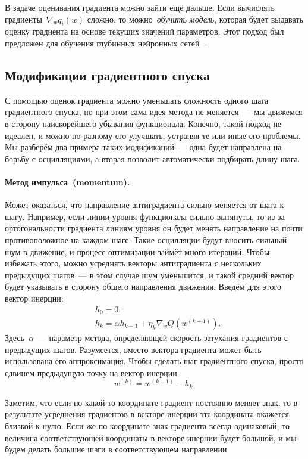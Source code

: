 \documentclass[12pt,fleqn]{article}
\begin{document}
В задаче оценивания градиента можно зайти ещё дальше.
Если вычислять градиенты~$\nabla_w q_i(w)$ сложно,
то можно~\emph{обучить модель}, которая будет выдавать оценку градиента на основе текущих значений параметров.
Этот подход был предложен для обучения глубинных нейронных сетей~\cite{jaderberg16synthetic}.

\subsection{Модификации градиентного спуска}

С помощью оценок градиента можно уменьшать сложность одного шага градиентного спуска,
но при этом сама идея метода не меняется~--- мы движемся в сторону наискорейшего убывания функционала.
Конечно, такой подход не идеален, и можно по-разному его улучшать, устраняя те или иные его проблемы.
Мы разберём два примера таких модификаций~--- одна будет направлена на борьбу с осцилляциями, а вторая
позволит автоматически подбирать длину шага.

\paragraph{Метод импульса~(momentum).}
Может оказаться, что направление антиградиента сильно меняется от шага к шагу.
Например, если линии уровня функционала сильно вытянуты, то из-за ортогональности градиента линиям уровня
он будет менять направление на почти противоположное на каждом шаге.
Такие осцилляции будут вносить сильный шум в движение, и процесс оптимизации займёт много итераций.
Чтобы избежать этого, можно усреднять векторы антиградиента с нескольких предыдущих шагов~--- в этом
случае шум уменьшится, и такой средний вектор будет указывать в сторону общего направления движения.
Введём для этого вектор инерции:
\begin{align*}
    &h_0 = 0;\\
    &h_k = \alpha h_{k - 1} + \eta_k \nabla_w Q(w^{(k-1)}).
\end{align*}
Здесь~$\alpha$~--- параметр метода, определяющей скорость затухания градиентов с предыдущих шагов.
Разумеется, вместо вектора градиента может быть использована его аппроксимация.
Чтобы сделать шаг градиентного спуска, просто сдвинем предыдущую точку на вектор инерции:
\[
    w^{(k)} = w^{(k-1)} - h_k.
\]

Заметим, что если по какой-то координате градиент постоянно меняет знак, то в результате усреднения
градиентов в векторе инерции эта координата окажется близкой к нулю.
Если же по координате знак градиента всегда одинаковый, то величина соответствующей координаты
в векторе инерции будет большой, и мы будем делать большие шаги в соответствующем направлении.
\end{document}
